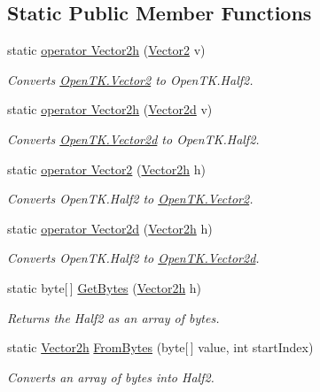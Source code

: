 \subsection*{Static Public Member Functions}
\begin{DoxyCompactItemize}
\item 
static \hyperlink{struct_open_t_k_1_1_vector2h_a08bd57716156ba8ceaf2a0a08cbadfc8}{operator Vector2h} (\hyperlink{struct_open_t_k_1_1_vector2}{Vector2} v)
\begin{DoxyCompactList}\small\item\em Converts \hyperlink{struct_open_t_k_1_1_vector2}{Open\-T\-K.\-Vector2} to Open\-T\-K.\-Half2.\end{DoxyCompactList}\item 
static \hyperlink{struct_open_t_k_1_1_vector2h_abb84bcf5fcd53c195c67b79507761a53}{operator Vector2h} (\hyperlink{struct_open_t_k_1_1_vector2d}{Vector2d} v)
\begin{DoxyCompactList}\small\item\em Converts \hyperlink{struct_open_t_k_1_1_vector2d}{Open\-T\-K.\-Vector2d} to Open\-T\-K.\-Half2.\end{DoxyCompactList}\item 
static \hyperlink{struct_open_t_k_1_1_vector2h_ad70b03a9a9a4d4c87efdafae7449b104}{operator Vector2} (\hyperlink{struct_open_t_k_1_1_vector2h}{Vector2h} h)
\begin{DoxyCompactList}\small\item\em Converts Open\-T\-K.\-Half2 to \hyperlink{struct_open_t_k_1_1_vector2}{Open\-T\-K.\-Vector2}.\end{DoxyCompactList}\item 
static \hyperlink{struct_open_t_k_1_1_vector2h_acf15cbcd9a49565be9c962b2f9c31fbe}{operator Vector2d} (\hyperlink{struct_open_t_k_1_1_vector2h}{Vector2h} h)
\begin{DoxyCompactList}\small\item\em Converts Open\-T\-K.\-Half2 to \hyperlink{struct_open_t_k_1_1_vector2d}{Open\-T\-K.\-Vector2d}.\end{DoxyCompactList}\item 
static byte\mbox{[}$\,$\mbox{]} \hyperlink{struct_open_t_k_1_1_vector2h_a06bcb7a97551a6622cb852558d8641bb}{Get\-Bytes} (\hyperlink{struct_open_t_k_1_1_vector2h}{Vector2h} h)
\begin{DoxyCompactList}\small\item\em Returns the Half2 as an array of bytes.\end{DoxyCompactList}\item 
static \hyperlink{struct_open_t_k_1_1_vector2h}{Vector2h} \hyperlink{struct_open_t_k_1_1_vector2h_a8576bca5425a1aa0116caebc9ade55bd}{From\-Bytes} (byte\mbox{[}$\,$\mbox{]} value, int start\-Index)
\begin{DoxyCompactList}\small\item\em Converts an array of bytes into Half2.\end{DoxyCompactList}\end{DoxyCompactItemize}
